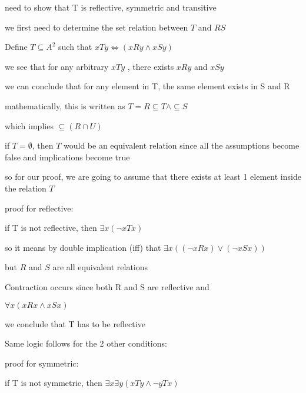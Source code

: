 \documentclass[12pts,A4]{article}
\begin{document}
\begin{flushleft}

    need to show that T is reflective, symmetric and transitive
    

    \bigskip
    \bigskip

    we first need to determine the set relation between $T$ and $R S$
    
    Define $T \subseteq A^{2}$ such that $xTy \iff (xRy \wedge xSy)$

    we see that for any arbitrary $xTy$ , there exists $xRy$ and $xSy$

    we can conclude that for any element in T, the same element exists in S and R

    mathematically, this is written as $T = R \subseteq T \wedge \subseteq S$
    
    which implies $\subseteq ( R \cap U)$ 
    \bigskip
    

    

    if $ T = \emptyset $, then $T$ would be an equivalent relation since all the assumptions become false and implications become true
    
    so for our proof, we are going to assume that there exists at least 1 element inside the relation $T$

    
    \bigskip

    proof for reflective:
    
    \bigskip

    if T is not reflective, then $ \exists x   (\neg x T x) $

    so it means by double implication (iff) that $ \exists x( (\neg xRx)
    \vee (\neg xSx)) $

    

    but $R$ and $S$ are all equivalent relations 

    Contraction occurs since both R and S are reflective and 

    $\forall x( xRx \wedge xSx)$

    we conclude that T has to be reflective

    \bigskip


    Same logic follows for the 2 other conditions:

    \bigskip

    proof for symmetric:
    
    \bigskip

    if T is not symmetric, then $ \exists x \exists y  ( xTy \wedge \neg y T x) $


\end{flushleft}
\end{document}
